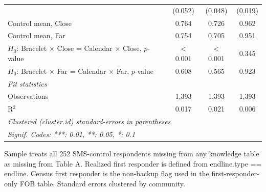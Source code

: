 \begin{tabular}{lccc}
                                                                         & (0.052)          & (0.048)                  & (0.019)\\   
   Control mean, Close                                                   & 0.764            & 0.726                    & 0.962\\  
   Control mean, Far                                                     & 0.754            & 0.705                    & 0.951\\  
   $H_0$: Bracelet $\times$ Close = Calendar $\times$ Close, $p$-value   & $<$0.001         & $<$0.001                 & 0.345\\  
   $H_0$: Bracelet $\times$ Far = Calendar $\times$ Far, $p$-value       & 0.608            & 0.565                    & 0.923\\  
   \midrule
   \emph{Fit statistics}\\
   Observations                                                          & 1,393            & 1,393                    & 1,393\\  
   R$^2$                                                                 & 0.017            & 0.021                    & 0.006\\  
   \midrule \midrule
   \multicolumn{4}{l}{\emph{Clustered (cluster.id) standard-errors in parentheses}}\\
   \multicolumn{4}{l}{\emph{Signif. Codes: ***: 0.01, **: 0.05, *: 0.1}}\\
\end{tabular}
 
\par \raggedright 
Sample treats all 252 SMS-control respondents missing from any knowledge table as missing from Table A. Realized first responder is defined from endline.type == endline. Census first responder is the non-backup flag used in the first-responder-only FOB table. Standard errors clustered by community.


